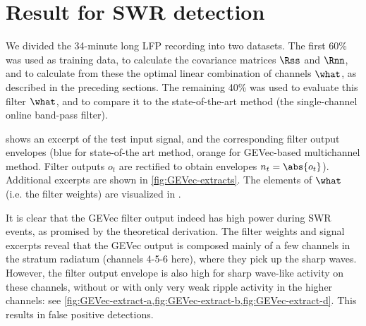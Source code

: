 \section{Result for SWR detection}

We divided the 34-minute long LFP recording into two datasets. The first 60\% was used as training data, to calculate the covariance matrices $\Rss$ and $\Rnn$, and to calculate from these the optimal linear combination of channels $\what$, as described in the preceding sections. The remaining 40\% was used to evaluate this filter $\what$, and to compare it to the state-of-the-art method (the single-channel online band-pass filter).

\begin{figure}
\label{fig:LSM-comp}
\end{figure}

 shows an excerpt of the test input signal, and the corresponding filter output envelopes (blue for state-of-the art method, orange for GEVec-based multichannel method. Filter outputs $o_t$ are rectified to obtain envelopes $n_t = \abs{o_t}$). Additional excerpts are shown in \cref{fig:GEVec-extracts}. The elements of $\what$ (i.e. the filter weights) are visualized in .

It is clear that the GEVec filter output indeed has high power during SWR events, as promised by the theoretical derivation. The filter weights and signal excerpts reveal that the GEVec output is composed mainly of a few channels in the stratum radiatum (channels 4-5-6 here), where they pick up the sharp waves. However, the filter output envelope is also high for sharp wave-like activity on these channels, without or with only very weak ripple activity in the higher channels: see \cref{fig:GEVec-extract-a,fig:GEVec-extract-b,fig:GEVec-extract-d}. This results in false positive detections.

